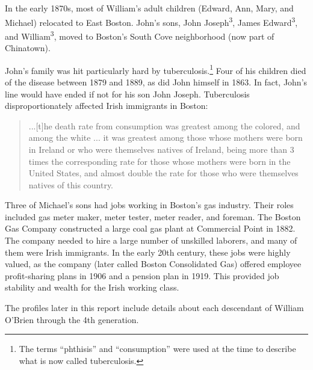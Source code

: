 In the early 1870s, most of William's adult children (Edward, Ann, Mary, and Michael) relocated to East Boston. John's sons, John Joseph\textsuperscript{3}, James Edward\textsuperscript{3}, and William\textsuperscript{3}, moved to Boston's South Cove neighborhood (now part of Chinatown).\cite{1870sAddresses}

John's family was hit particularly hard by tuberculosis.\footnote{The terms ``phthisis'' and ``consumption'' were used at the time to describe what is now called tuberculosis.\cite{TuberculosisHistory}} Four of his children died of the disease between 1879 and 1889, as did John himself in 1863.\cite{John2OBrienDeath} In fact, John's line would have ended if not for his son John Joseph. Tuberculosis disproportionately affected Irish immigrants in Boston:

\begin{quote}
	...[t]he death rate from consumption was greatest among the colored, and among the white ... it was greatest among those whose mothers were born in Ireland or who were themselves natives of Ireland, being more than 3 times the corresponding rate for those whose mothers were born in the United States, and almost double the rate for those who were themselves natives of this country.\cite{VitalStatistics}
\end{quote}

Three of Michael's sons had jobs working in Boston's gas industry. Their roles included gas meter maker, meter tester, meter reader, and foreman. The Boston Gas Company constructed a large coal gas plant at Commercial Point in 1882. The company needed to hire a large number of unskilled laborers, and many of them were Irish immigrants.\cite{Keating:11} In the early 20th century, these jobs were highly valued, as the company (later called Boston Consolidated Gas) offered employee profit-sharing plans in 1906 and a pension plan in 1919. This provided job stability and wealth for the Irish working class.\cite{Keating:20}

The profiles later in this report include details about each descendant of William O'Brien through the 4th generation.
